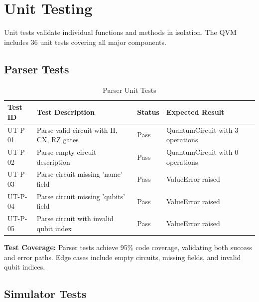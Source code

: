 \section{Unit Testing}
Unit tests validate individual functions and methods in isolation. The QVM includes 36 unit tests covering all major components.

\subsection{Parser Tests}

\begin{table}[h]
\centering
\caption{Parser Unit Tests}
\begin{tabular}{|p{2cm}|p{5cm}|p{2cm}|p{3cm}|}
\hline
\textbf{Test ID} & \textbf{Test Description} & \textbf{Status} & \textbf{Expected Result} \\
\hline
UT-P-01 & Parse valid circuit with H, CX, RZ gates & Pass & QuantumCircuit with 3 operations \\
\hline
UT-P-02 & Parse empty circuit description & Pass & QuantumCircuit with 0 operations \\
\hline
UT-P-03 & Parse circuit missing 'name' field & Pass & ValueError raised \\
\hline
UT-P-04 & Parse circuit missing 'qubits' field & Pass & ValueError raised \\
\hline
UT-P-05 & Parse circuit with invalid qubit index & Pass & ValueError raised \\
\hline
\end{tabular}
\end{table}

\textbf{Test Coverage:} Parser tests achieve 95\% code coverage, validating both success and error paths. Edge cases include empty circuits, missing fields, and invalid qubit indices.

\subsection{Simulator Tests}

